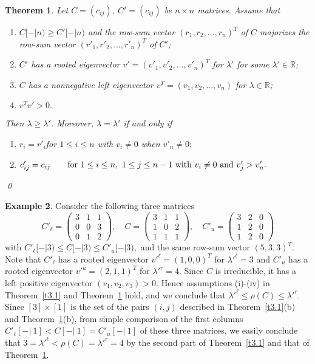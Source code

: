 \documentclass[final,3p, times, 12pt]{elsarticle}
\theoremstyle{plain}
\newtheorem{thm}{Theorem}[section]
\theoremstyle{definition}
\newtheorem{exam}[thm]{Example}
\theoremstyle{remark}
\numberwithin{equation}{section}
\begin{document}
\begin{thm}\label{t3.1'}
 Let $C=(c_{ij})$, $C'=(c_{ij})$ be  $n\times n$ matrices.
Assume that
\begin{enumerate}
\item[(i)]   $C[-|n)\geq C'[-|n)$ and the row-sum vector $(r_1, r_2, \ldots, r_n)^T$  of $C$ majorizes the row-sum vector $(r'_1, r'_2, \ldots, r'_n)^T$ of $C'$;
\item[(ii)]  $C'$ has a rooted eigenvector $v'=(v'_1, v'_2, \ldots, v'_n)^T$ for $\lambda'$ for some  $\lambda'\in \mathbb{R}$;
\item[(iii)] $C$ has a nonnegative left eigenvector $v^T=(v_1, v_2, \ldots, v_n)$ for $\lambda\in \mathbb{R}$;
\item[(iv)] $v^Tv'>0.$
\end{enumerate}
 Then $\lambda\geq \lambda'$.
Moreover, $\lambda=\lambda'$
if and only if
\begin{enumerate}
\item[(a)] $r_i=r'_i$\qquad for $1\leq i\leq n$ with $v_i\not=0$ when $v'_n\not=0;$
\item[(b)]
$c'_{ij}=c_{ij}\qquad \hbox{for~}1\leq i\leq n,~1\leq j\leq n-1 \hbox{~with~} v_i\ne 0 \hbox{~and~} v'_j> v'_n.$
\end{enumerate}  \qed
\end{thm}


\begin{exam}\label{exam2}
Consider the following three matrices
$$C'_\ell= \begin{pmatrix}
3 & 1 & 1\\ 0 & 0 & 3 \\ 0 & 1 & 2
\end{pmatrix}, \quad  C=\begin{pmatrix}
3 & 1 & 1\\ 1 & 0 & 2 \\ 1 & 1 & 1
\end{pmatrix}, \quad C'_u=\begin{pmatrix}
3 & 2 & 0\\ 1 & 2 & 0 \\ 1 & 2 & 0
\end{pmatrix}$$
with $C'_\ell[-|3)\leq C[-|3) \leq C'_u[-|3),$ and the same row-sum vector $(5, 3, 3)^T$.
Note that $C'_\ell$ has a rooted eigenvector $v'^\ell=(1, 0, 0)^T$ for $\lambda'^\ell=3$
and $C'_u$ has a rooted eigenvector $v'^u=(2, 1, 1)^T$ for $\lambda'^r=4$.
Since $C$ is irreducible, it has a left positive eigenvector $(v_1,v_2,v_3)>0$.
Hence assumptions (i)-(iv) in Theorem~\ref{t3.1} and Theorem~\ref{t3.1'} hold, and
we conclude that $\lambda'^\ell\leq \rho(C)\leq \lambda'^r$.
Since $[3]\times [1]$ is the set of the pairs $(i,j)$ described in Theorem~\ref{t3.1}(b) and Theorem~\ref{t3.1'}(b),
from simple comparison of
the first columns $C'_\ell[-|~1]< C[-|~1] = C'_u[-|~1]$ of these three matrices,
we easily conclude that $3=\lambda'^\ell< \rho(C)= \lambda'^r=4$ by the second part of Theorem~\ref{t3.1} and that of Theorem~\ref{t3.1'}.
\end{exam}
\end{document}
